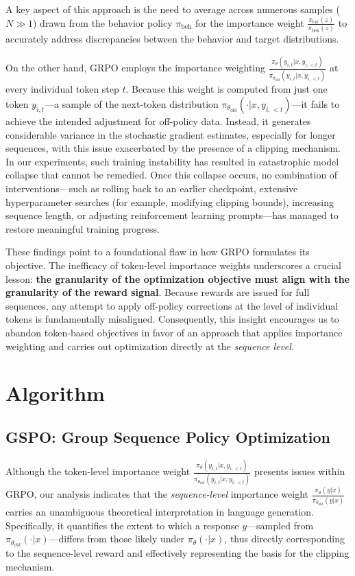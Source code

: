 A key aspect of this approach is the need to average across numerous samples ($N \gg 1$) drawn from the behavior policy $\pi_\text{beh}$ for the importance weight $\frac{ \pi_\text{tar} (z) }{ \pi_\text{beh} (z)}$ to accurately address discrepancies between the behavior and target distributions.

On the other hand, GRPO employs the importance weighting $\frac{ \pi_{\theta} (y_{i,t} | x, y_{i,<t}) }{ \pi_{\theta_\text{old}} (y_{i,t} | x,y_{i,<t})}$ at every individual token step $t$. Because this weight is computed from just one token $y_{i,t}$—a sample of the next-token distribution $\pi_{\theta_\text{old}}( \cdot | x, y_{i, <t})$—it fails to achieve the intended adjustment for off-policy data. Instead, it generates considerable variance in the stochastic gradient estimates, especially for longer sequences, with this issue exacerbated by the presence of a clipping mechanism. In our experiments, such training instability has resulted in catastrophic model collapse that cannot be remedied. Once this collapse occurs, no combination of interventions—such as rolling back to an earlier checkpoint, extensive hyperparameter searches (for example, modifying clipping bounds), increasing sequence length, or adjusting reinforcement learning prompts—has managed to restore meaningful training progress.

These findings point to a foundational flaw in how GRPO formulates its objective. The inefficacy of token-level importance weights underscores a crucial lesson: \textbf{the granularity of the optimization objective must align with the granularity of the reward signal}. Because rewards are issued for full sequences, any attempt to apply off-policy corrections at the level of individual tokens is fundamentally misaligned. Consequently, this insight encourages us to abandon token-based objectives in favor of an approach that applies importance weighting and carries out optimization directly at the \textit{sequence level}.

\section{Algorithm}

\subsection{GSPO: Group Sequence Policy Optimization}

Although the token-level importance weight $\frac{ \pi_{\theta} (y_{i,t} | x, y_{i,<t}) }{ \pi_{\theta_\text{old}} (y_{i,t} | x,y_{i,<t})}$ presents issues within GRPO, our analysis indicates that the \textit{sequence-level} importance weight $\frac{ \pi_{\theta} (y | x) }{ \pi_{\theta_\text{old}} (y | x)}$ carries an unambiguous theoretical interpretation in language generation. Specifically, it quantifies the extent to which a response $y$—sampled from $\pi_{\theta_\text{old}} (\cdot | x)$—differs from those likely under $\pi_{\theta} (\cdot | x)$, thus directly corresponding to the sequence-level reward and effectively representing the basis for the clipping mechanism.

